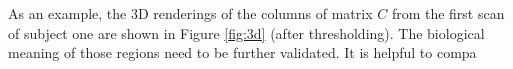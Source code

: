 \documentclass[fleqn]{article}
\let\oldref\ref
\renewcommand{\ref}[1]{(\oldref{#1})}
\begin{document}
As an example, the 3D renderings of the columns of matrix $C$ from the first scan of subject one are shown in Figure \oldref{fig:3d} (after thresholding). The biological meaning of those regions need to be further validated. It is helpful to compa
\end{document}
